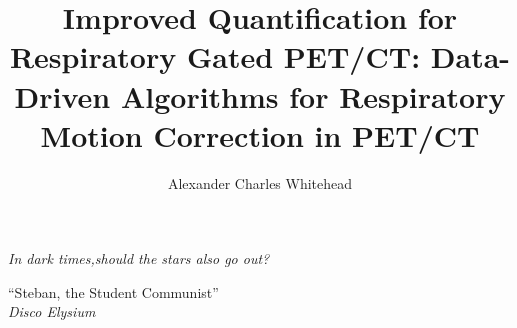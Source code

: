 
\title{Improved Quantification for Respiratory Gated PET/CT: Data-Driven Algorithms for Respiratory Motion Correction in PET/CT}
\author{Alexander Charles Whitehead}

\maketitle




\thispagestyle{empty}
\vspace*{\fill}
\setlength{\epigraphwidth}{0.7\linewidth}
\renewcommand{\epigraphflush}{center}
\renewcommand{\epigraphsize}{\large}
\epigraph{\textit{In dark times,\newline should the stars also go out?}}%
         {``Steban, the Student Communist''\\ \textit{Disco Elysium}}
\vfill

